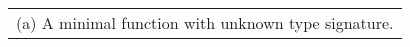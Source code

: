\scriptsize
\begin{tabular}[t]{l}
	(a) A minimal function with unknown type signature.
\end{tabular}
